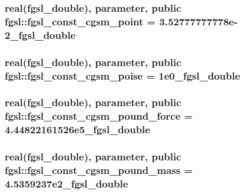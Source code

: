 \subsubsection[{fgsl\+\_\+const\+\_\+cgsm\+\_\+point}]{\setlength{\rightskip}{0pt plus 5cm}real({\bf fgsl\+\_\+double}), parameter, public fgsl\+::fgsl\+\_\+const\+\_\+cgsm\+\_\+point = 3.\+52777777778e-\/2\+\_\+fgsl\+\_\+double}\label{namespacefgsl_a924bd137c2b9e9abffbc4edb9826b398}
\hypertarget{namespacefgsl_ac2108186e2fec1e447f96ad1ab30ae23}{}
\subsubsection[{fgsl\+\_\+const\+\_\+cgsm\+\_\+poise}]{\setlength{\rightskip}{0pt plus 5cm}real({\bf fgsl\+\_\+double}), parameter, public fgsl\+::fgsl\+\_\+const\+\_\+cgsm\+\_\+poise = 1e0\+\_\+fgsl\+\_\+double}\label{namespacefgsl_ac2108186e2fec1e447f96ad1ab30ae23}
\hypertarget{namespacefgsl_a42219a1cda342fbf61675de1c4fa2e9a}{}
\subsubsection[{fgsl\+\_\+const\+\_\+cgsm\+\_\+pound\+\_\+force}]{\setlength{\rightskip}{0pt plus 5cm}real({\bf fgsl\+\_\+double}), parameter, public fgsl\+::fgsl\+\_\+const\+\_\+cgsm\+\_\+pound\+\_\+force = 4.\+44822161526e5\+\_\+fgsl\+\_\+double}\label{namespacefgsl_a42219a1cda342fbf61675de1c4fa2e9a}
\hypertarget{namespacefgsl_ae6b5172d0dcea9b11e99852be3ec5f1a}{}
\subsubsection[{fgsl\+\_\+const\+\_\+cgsm\+\_\+pound\+\_\+mass}]{\setlength{\rightskip}{0pt plus 5cm}real({\bf fgsl\+\_\+double}), parameter, public fgsl\+::fgsl\+\_\+const\+\_\+cgsm\+\_\+pound\+\_\+mass = 4.\+5359237e2\+\_\+fgsl\+\_\+double}\label{namespacefgsl_ae6b5172d0dcea9b11e99852be3ec5f1a}
\hypertarget{namespacefgsl_a4453ec263f2b4c5802122e762e1672c4}{}
